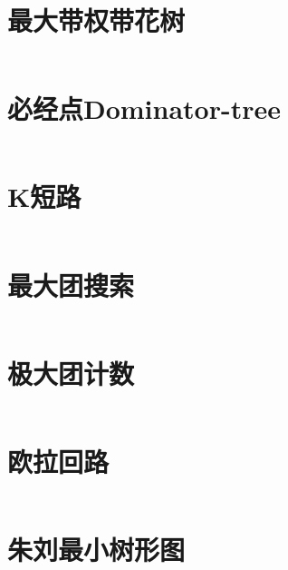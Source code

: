 \section{最大带权带花树}
\inputminted{cpp}{\source/graph-theory/weighted_blossom.cpp}
\section{必经点Dominator-tree}
\inputminted{cpp}{\source/graph-theory/dominator.cpp}
\section{K短路}
\inputminted{cpp}{\source/graph-theory/Kth-minimum-path.cpp}
\section{最大团搜索}
\inputminted{cpp}{\source/graph-theory/最大团搜索.cpp}
\section{极大团计数}
\inputminted{cpp}{\source/graph-theory/极大团计数.cpp}
\section{欧拉回路}
\inputminted{cpp}{\source/graph-theory/euler-tour.cpp}
\section{朱刘最小树形图}
\inputminted{cpp}{\source/graph-theory/minimum_arborescence.cpp}
